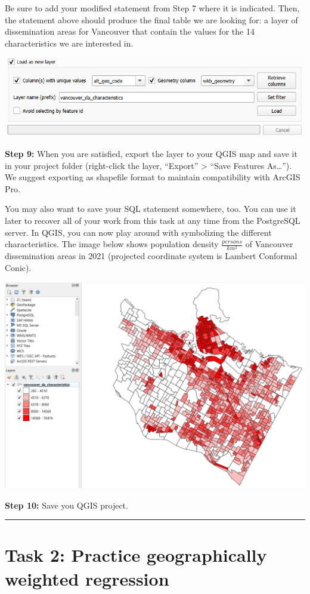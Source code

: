 \documentclass[
]{book}
\begin{document}
Be sure to add your modified statement from Step 7 where it is indicated. Then, the statement above should produce the final table we are looking for: a layer of dissemination areas for Vancouver that contain the values for the 14 characteristics we are interested in.

\includegraphics[width=0.75\linewidth]{images/05-qgis-final-query-load-layer}

\textbf{Step 9:} When you are satisfied, export the layer to your QGIS map and save it in your project folder (right-click the layer, ``Export'' \textgreater{} ``Save Features As\ldots{}''). We suggest exporting as shapefile format to maintain compatibility with ArcGIS Pro.

You may also want to save your SQL statement somewhere, too. You can use it later to recover all of your work from this task at any time from the PostgreSQL server. In QGIS, you can now play around with symbolizing the different characteristics. The image below shows population density \(\frac{persons}{km^2}\) of Vancouver dissemination areas in 2021 (projected coordinate system is Lambert Conformal Conic).

\includegraphics[width=0.75\linewidth]{images/05-qgis-population-density-vancouver-2021}

\textbf{Step 10:} Save you QGIS project.

\begin{center}\rule{0.5\linewidth}{0.5pt}\end{center}

\hypertarget{task-2-practice-geographically-weighted-regression}{%
\section*{Task 2: Practice geographically weighted regression}\label{task-2-practice-geographically-weighted-regression}}
\end{document}
